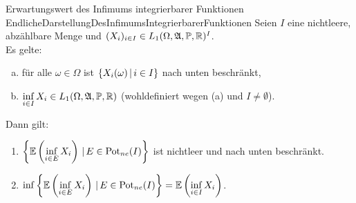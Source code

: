 \begin{korollar}{Erwartungswert des Infimums integrierbarer Funktionen}
                {EndlicheDarstellungDesInfimumsIntegrierbarerFunktionen}
Seien $I$ eine nichtleere, abzählbare Menge und 
$(X_{i})_{i \in I} \in L_1(\Omega, \mathfrak{A},\mathbb{P},\mathbb{R})^I$.\\
Es gelte:
\begin{enumerate}[(a)]
 \item für alle $\omega \in \Omega$ ist $\left\{X_i(\omega)\,|\,i \in I\right\}$
       nach unten beschränkt,
 \item $\underset{i\in I}\inf\, X_i \in L_1(\Omega, \mathfrak{A},\mathbb{P},\mathbb{R})$ (wohldefiniert
       wegen (a) und $I \neq \emptyset$).
\end{enumerate}
Dann gilt:
\begin{enumerate}[(1)]
 \item\label{EndlicheDarstellungDesInfimumsIntegrierbarerFunktionen1}
      $\left\{\mathbb{E}\left(\underset{i\in E}\inf\,X_i\right)\,|\,E\in\mathop{\textrm{Pot}}\nolimits_{ne}(I)\right\}$ ist nichtleer
      und nach unten beschränkt.
 \item\label{EndlicheDarstellungDesInfimumsIntegrierbarerFunktionen2}
      $\inf\left\{\mathbb{E}\left( \underset{i\in E}\inf\, X_i\right)\,|\,E\in\mathop{\textrm{Pot}}\nolimits_{ne}(I)\right\} 
      = \mathbb{E}\left(\underset{i\in I}\inf\,X_i \right)$.
\end{enumerate}
\end{korollar}
